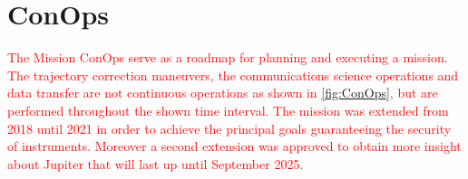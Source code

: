 \section{ConOps}
\label{sec:conops}

\textcolor{red}{
The Mission ConOps serve as a roadmap for planning and executing a mission. The trajectory correction maneuvers, the communications science operations and data transfer are not continuous operations as shown in \autoref{fig:ConOps}, but are performed throughout the shown time interval.
The mission was extended from 2018 until 2021 in order to achieve the principal goals guaranteeing the security of instruments. Moreover a second extension was approved to obtain more insight about Jupiter that will last up until September 2025.
}


